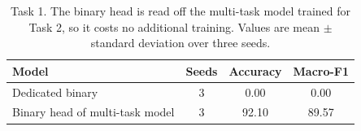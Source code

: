 \begin{table}[t]
\caption{Task 1. The binary head is read off the multi-task model trained for Task 2, so it costs no additional training. Values are mean $\pm$ standard deviation over three seeds.}
\label{tab:task1}
\centering
\small
\begin{tabular}{@{}lccc@{}}
\toprule
Model & Seeds & Accuracy & Macro-F1 \\
\midrule
Dedicated binary \phobert{} & 3 & 0.00 & 0.00 \\
Binary head of multi-task model & 3 & 92.10 & 89.57 \\

\bottomrule
\end{tabular}
\end{table}
